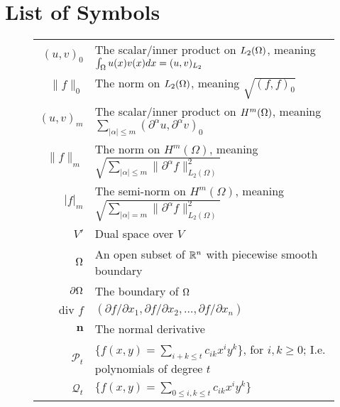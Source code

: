 \section*{List of Symbols}
\begin{center}
\begin{figure}[ht!]
\setlength{\extrarowheight}{10pt}
\begin{tabularx}{\textwidth}{rX}
$(u,v)_0$ &   The scalar/inner product on $L_2(\Omega)$, meaning $\int_\Omega u(x)v(x) dx =(u,v)_{L_2}$ \\
$\|f\|_0$ & The norm on $L_2(\Omega)$, meaning $\sqrt{(f,f)_0}$ \\
$(u,v)_m$ & The scalar/inner product on $H^m(\Omega)$, meaning $ \sum_{|\alpha|\leq m}(\partial ^{\alpha}u, \partial ^{\alpha} v)_0 $\\
$\|f\|_m$ & The norm on $H^m(\Omega)$, meaning $\sqrt{\sum_{|\alpha|\leq m}\|\partial ^\alpha f\|_{L_2(\Omega)}^2}$ \\
$|f|_m$ & The semi-norm on $H^m(\Omega)$, meaning $\sqrt{\sum_{|\alpha|= m}\|\partial ^\alpha f\|_{L_2(\Omega)}^2}$ \\
$V'$ & Dual space over $V$\\
$\Omega$ & An open subset of $\mathbb{R}^n$ with piecewise smooth boundary \\
$\partial\Omega$ & The boundary of $\Omega$\\
$\text{div }f$ & $(\partial f/\partial x_1,\partial f/\partial x_2,\ldots,\partial f/\partial x_n)$ \\
$\mathbf{n}$ & The normal derivative\\
$\mathcal{P}_t$ & $\{ f(x,y) = \sum_{i+k \leq t} c_{ik}x^i y^k \}$, for $i,k\geq 0$; I.e. polynomials of degree $t$ \\
$\mathcal{Q}_t$ & $\{ f(x,y)= \sum_{0\leq i,k \leq t} c_{ik}x^iy^k \}$ \\
\end{tabularx}
\end{figure}
\end{center}
\vfill
